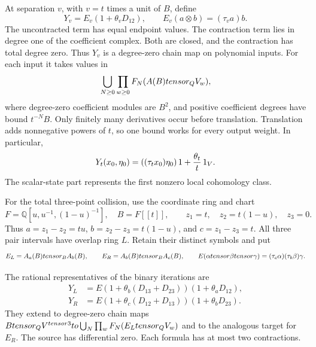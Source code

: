 At separation \(v\), with \(v=t\) times a unit of \(B\), define
\begin{equation}\label{nl:eq:binary}
 Y_v=E_v(1+\theta_vD_{12}),\qquad E_v(a\otimes b)=(\tau_va)b.
\end{equation}
The uncontracted term has equal endpoint values. The contraction term
lies in degree one of the coefficient complex. Both are closed,
and the contraction has total degree zero. Thus \(Y_v\) is a
degree-zero chain map on polynomial inputs.
For each input it takes values in
\[
 \bigcup_{N\geq0}\prod_{w\geq0}
 F_N(A(B)tensor_{Q}V_w),
\]
where degree-zero coefficient modules are \(B^2\), and positive
coefficient degrees have bound \(t^{-N}B\).
Only finitely many derivatives occur before translation. Translation
adds nonnegative powers of \(t\), so one bound works for every output weight.
In particular,
\[
 Y_t(x_0,\eta_0)=((\tau_tx_0)\eta_0)\,1+\frac{\theta_t}{t}\,1_{V}.
\]
The scalar-state part represents the first nonzero local cohomology class.

For the total three-point collision, use the coordinate ring and chart
\begin{equation}\label{nl:eq:normal-chart}
 F=\mathbb Q[u,u^{-1},(1-u)^{-1}],\quad B=F[[t]],\qquad
 z_1=t,\quad z_2=t(1-u),\quad z_3=0.
\end{equation}
Thus
\(a=z_1-z_2=tu\), \(b=z_2-z_3=t(1-u)\), and
\(c=z_1-z_3=t\). All three pair intervals have overlap ring \(L\).
Retain their distinct symbols and put
\[
 E_L=A_a(B)tensor_BA_b(B),\qquad
 E_R=A_b(B)tensor_BA_c(B),\qquad
 E(\alpha tensor\beta tensor\gamma)
       =(\tau_c\alpha)(\tau_b\beta)\gamma.
\]

\begin{proposition}\label{nl:prop:iterations}
The rational representatives of the binary iterations are
\begin{equation}\label{nl:eq:iterations}
 \begin{aligned}
 Y_L&=E(1+\theta_b(D_{13}+D_{23}))(1+\theta_aD_{12}),\\
 Y_R&=E(1+\theta_c(D_{12}+D_{13}))(1+\theta_bD_{23}).
 \end{aligned}
\end{equation}
They extend to degree-zero chain maps
\(Btensor_{Q}V^{tensor3}to
\bigcup_N\prod_w F_N(E_Ltensor_{Q}V_w)\)
and to the analogous target for \(E_R\).
The source has differential zero. Each formula has at most two contractions.
\end{proposition}

